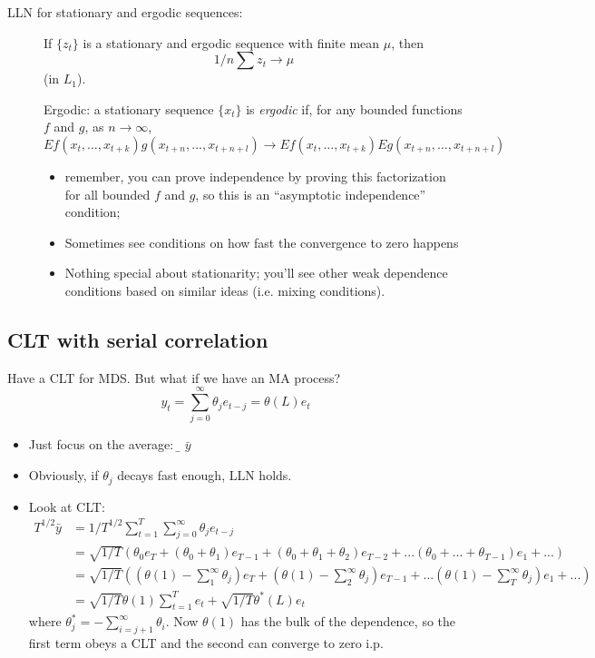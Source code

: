 \begin{description}
\item[LLN for stationary and ergodic sequences:]

  If $\{z_t\}$ is a stationary and ergodic sequence with finite mean
  $μ$, then
  \[1/n ∑ z_t → μ\] (in $L_1$).

  Ergodic: a stationary sequence $\{x_t\}$ is \emph{ergodic} if, for
  any bounded functions $f$ and $g$, as $n → ∞$,
  \[E f( x_t, …, x_{t + k}) g(x_{t + n}, …, x_{ t + n + l} ) → E f(
  x_t, …, x_{ t + k } ) E g(x_{ t + n }, …, x_{ t + n + l} )\]

  \begin{itemize}
  \item remember, you can prove independence by proving this
    factorization for all bounded $f$ and $g$, so this is an ``asymptotic
    independence'' condition;
  \item Sometimes see conditions on how fast the convergence to zero
    happens
  \item Nothing special about stationarity; you'll see other weak
    dependence conditions based on similar ideas (i.e. mixing
    conditions).
  \end{itemize}
\end{description}

\subsection{CLT with serial correlation}

Have a CLT for MDS. But what if we have an MA process?
\[y_t = ∑_{j=0}^∞ θ_j e_{t-j} = θ(L) e_t\]

\begin{itemize}
\item Just focus on the average: $̱\bar y$
\item Obviously, if $θ_j$ decays fast enough, LLN holds.
\item Look at CLT:
  \begin{align*}
    T^{1/2} \bar y
    &= 1/T^{1/2} ∑_{t=1}^T ∑_{j=0}^∞ θ_j e_{t-j} \\
    &= \sqrt{1/T} ( θ_0 e_T +
    ( θ_0 + θ_1 ) e_{T-1} +
    ( θ_0 + θ_1 + θ_2 )  e_{T-2} + ...
    ( θ_0 + ... + θ_{T-1} ) e_1 + ... ) \\
    &= \sqrt{1/T} ( ( θ(1) - ∑_1^∞ θ_j ) e_T +
    ( θ(1) - ∑_2^∞ θ_j ) e_{T-1} + ...
    ( θ(1) - ∑_T^∞ θ_j ) e_1 + ... ) \\
    &= \sqrt{1/T} θ(1) ∑_{t=1}^T e_t + \sqrt{1/T} θ^*(L) e_t
  \end{align*}
  where $θ_j^* = - ∑_{i=j+1}^∞ θ_i$.  Now $θ(1)$ has the bulk of the
  dependence, so the first term obeys a CLT and the second can
  converge to zero i.p.
\end{itemize}

